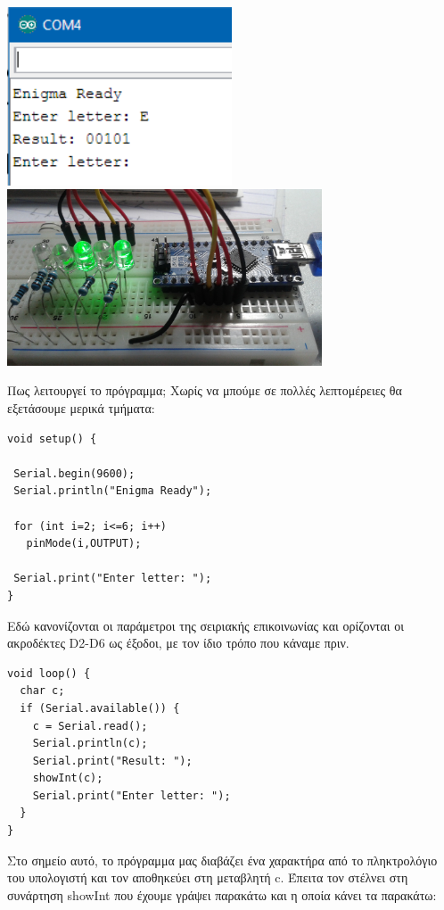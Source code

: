 \documentclass[a4paper,twoside,12pt]{article}
\begin{document}
\begin{center}
  \includegraphics[width=0.5\textwidth]{images/main/letter-e}
  \includegraphics[width=0.7\textwidth]{images/main/letter-e-leds}
\end{center}


Πως λειτουργεί το πρόγραμμα; Χωρίς να μπούμε σε πολλές λεπτομέρειες θα εξετάσουμε μερικά τμήματα:

\begin{verbatim}
void setup() { 

 Serial.begin(9600);
 Serial.println("Enigma Ready"); 
    
 for (int i=2; i<=6; i++)
   pinMode(i,OUTPUT);
 
 Serial.print("Enter letter: ");
}
\end{verbatim}

Εδώ κανονίζονται οι παράμετροι της σειριακής επικοινωνίας και ορίζονται οι ακροδέκτες D2-D6 ως έξοδοι, με τον ίδιο τρόπο που κάναμε πριν.

\begin{verbatim}
void loop() {
  char c;
  if (Serial.available()) {
    c = Serial.read();
    Serial.println(c); 
    Serial.print("Result: ");    
    showInt(c);
    Serial.print("Enter letter: ");
  }
}
\end{verbatim}

Στο σημείο αυτό, το πρόγραμμα μας διαβάζει ένα χαρακτήρα από το πληκτρολόγιο του υπολογιστή και τον αποθηκεύει στη μεταβλητή c. Έπειτα τον στέλνει στη συνάρτηση showInt που έχουμε γράψει παρακάτω και η οποία κάνει τα παρακάτω:
\end{document}
